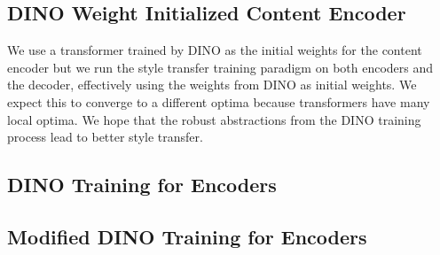 \documentclass{article}
\begin{document}
\subsection{DINO Weight Initialized Content Encoder}

We use a transformer trained by DINO as the initial weights for the content encoder but we run the style transfer training paradigm on both encoders and the decoder, effectively using the weights from DINO as initial weights. We expect this to converge to a different optima because transformers have many local optima. We hope that the robust abstractions from the DINO training process lead to better style transfer.

\subsection{DINO Training for Encoders}



\subsection{Modified DINO Training for Encoders}



\medskip

\nocite{*}


\end{document}
